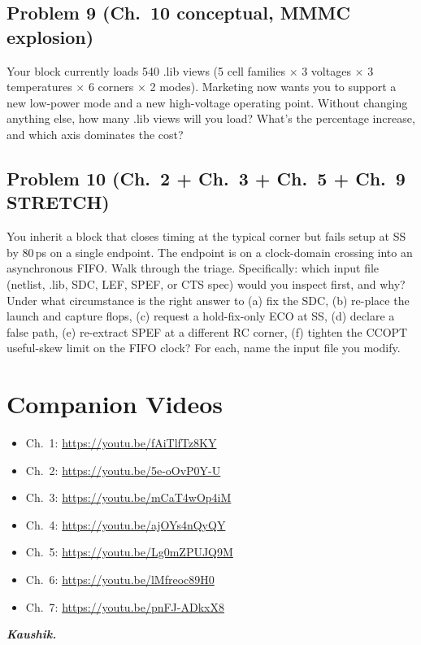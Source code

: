 \section*{Problem 9 (Ch.~10 conceptual, MMMC explosion)}
Your block currently loads 540 .lib views (5 cell families $\times$ 3 voltages $\times$ 3 temperatures $\times$ 6 corners $\times$ 2 modes). Marketing now wants you to support a new low-power mode and a new high-voltage operating point. Without changing anything else, how many .lib views will you load? What's the percentage increase, and which axis dominates the cost?

\section*{Problem 10 (Ch.~2 + Ch.~3 + Ch.~5 + Ch.~9 STRETCH)}
You inherit a block that closes timing at the typical corner but fails setup at SS by 80\,ps on a single endpoint. The endpoint is on a clock-domain crossing into an asynchronous FIFO. Walk through the triage. Specifically: which input file (netlist, .lib, SDC, LEF, SPEF, or CTS spec) would you inspect first, and why? Under what circumstance is the right answer to (a) fix the SDC, (b) re-place the launch and capture flops, (c) request a hold-fix-only ECO at SS, (d) declare a false path, (e) re-extract SPEF at a different RC corner, (f) tighten the CCOPT useful-skew limit on the FIFO clock? For each, name the input file you modify.

\chapter*{Companion Videos}

\begin{itemize}[leftmargin=*]
  \item Ch.~1: \url{https://youtu.be/fAiTlfTz8KY}
  \item Ch.~2: \url{https://youtu.be/5e-oOvP0Y-U}
  \item Ch.~3: \url{https://youtu.be/mCaT4wOp4iM}
  \item Ch.~4: \url{https://youtu.be/ajOYs4nQyQY}
  \item Ch.~5: \url{https://youtu.be/Lg0mZPUJQ9M}
  \item Ch.~6: \url{https://youtu.be/lMfreoc89H0}
  \item Ch.~7: \url{https://youtu.be/pnFJ-ADkxX8}
\end{itemize}

\vfill
\noindent\hfill\textbf{\textit{Kaushik.}}


